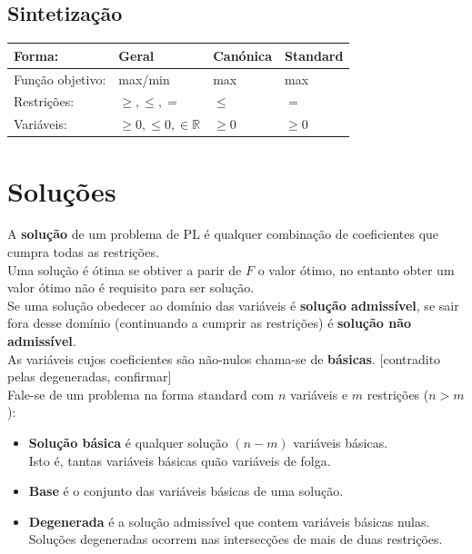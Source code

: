 \documentclass[]{report}
\begin{document}
\subsection{Sintetização}
\begin{tabular}{l|l|l|l}
\textbf{Forma}:  & Geral           & Canónica & Standard \\\hline
Função objetivo: & max/min         & max      & max \\\hline
Restrições:      & $\geq,\leq, =$  & $\leq$   & $=$\\\hline
Variáveis:       & $\geq 0,\leq 0,\in \mathbb{R}$ & $\geq 0$ & $\geq 0$         
\end{tabular}
\section{Soluções}
A \textbf{solução} de um problema de PL é qualquer combinação de coeficientes que cumpra todas as restrições.\\
Uma solução é ótima se obtiver a parir de $F$ o valor ótimo, no entanto obter um valor ótimo não é requisito para ser solução.\\
Se uma solução obedecer ao domínio das variáveis é \textbf{solução admissível}, se sair fora desse domínio (continuando a cumprir as restrições) é \textbf{solução não admissível}.\\
As variáveis cujos coeficientes são não-nulos chama-se de \textbf{básicas}. [contradito pelas degeneradas, confirmar]\\[0.5cm]
Fale-se de um problema na forma standard com $n$ variáveis e $m$ restrições ($n>m$):
\begin{itemize}
\item \textbf{Solução básica} é qualquer solução $(n-m)$ variáveis básicas.\\
Isto é, tantas variáveis básicas quão variáveis de folga.
\item \textbf{Base} é o conjunto das variáveis básicas de uma solução.
\item \textbf{Degenerada} é a solução admissível que contem variáveis básicas nulas.\\
Soluções degeneradas ocorrem nas intersecções de mais de duas restrições.
\end{itemize}
\end{document}
